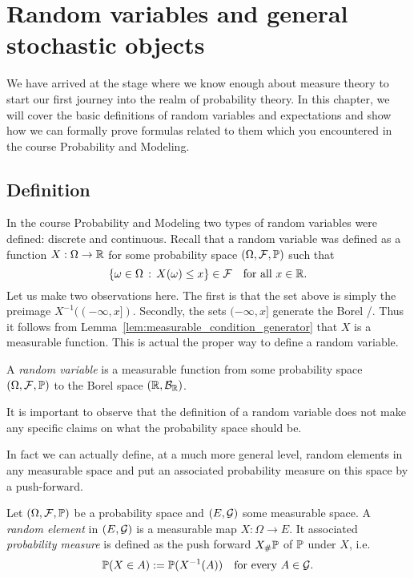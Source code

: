 
\section{Random variables and general stochastic objects}\label{sec:random_variables}


We have arrived at the stage where we know enough about measure theory to start our first journey into the realm of probability theory. In this chapter, we will cover the basic definitions of random variables and expectations and show how we can formally prove formulas related to them which you encountered in the course Probability and Modeling. 

\subsection{Definition}

In the course Probability and Modeling two types of random variables were defined: discrete and continuous. Recall that a random variable was defined as a function $X : \Omega \to \mathbb R$ for some probability space $(\Omega, \mathcal F, \mathbb P)$ such that
\[
	\{\omega \in \Omega \, : \, X(\omega) \le x\} \in \mathcal F \quad \text{for all } x \in \mathbb R.
\]
Let us make two observations here. The first is that the set above is simply the preimage $X^{-1}((-\infty,x])$. Secondly, the sets $(-\infty, x]$ generate the Borel \sigalg/. Thus it follows from Lemma~\ref{lem:measurable_condition_generator} that $X$ is a measurable function. This is actual the proper way to define a random variable.

\begin{definition}\label{def:random_variable}
A \emph{random variable} is a measurable function from some probability space $(\Omega,\mathcal F, \mathbb P)$ to the Borel space $(\mathbb R, \mathcal B_{\mathbb R})$.
\end{definition}

It is important to observe that the definition of a random variable does not make any specific claims on what the probability space should be. 

In fact we can actually define, at a much more general level, random elements in any measurable space and put an associated probability measure on this space by a push-forward.

\begin{definition}
Let $(\Omega,\mathcal F, \mathbb P)$ be a probability space and $(E,\mathcal G)$ some measurable space. A \emph{random element} in $(E,\mathcal G)$ is a measurable map $X : \Omega \to E$. It associated \emph{probability measure} is defined as the push forward $X_\# \mathbb P$ of $\mathbb P$ under $X$, i.e.
\[
	\mathbb P(X \in A) := \mathbb P(X^{-1}(A)) \quad \text{for every } A \in \mathcal G.
\]
\end{definition}


